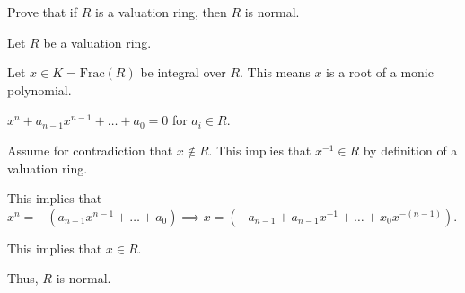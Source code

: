 \documentclass[12pt, letterpaper]{article}
\begin{document}
\color{\TextColor}
\pagecolor{\colormode}
\setlength{\parindent}{0pt}
\pagestyle{fancy}
\fancyhf{}

\begin{problem}{}
    Prove that if $R$ is a valuation ring, then $R$ is normal.
\end{problem}
\begin{problemproof}
    Let $R$ be a valuation ring.

    Let $x \in K=\mathrm{Frac}(R)$ be integral over $R$. This means $x$ is a root of a monic polynomial.

    $x^n+a_{n-1}x^{n-1}+\dots+a_0=0$ for $a_i \in R$.

    Assume for contradiction that $x \notin R$. This implies that $x^{-1} \in R$ by definition of a valuation ring.

    This implies that $x^n=-(a_{n-1}x^{n-1}+\dots+a_0) \implies x=(-a_{n-1}+a_{n-1}x^{-1}+\dots+x_0x^{-(n-1)})$.

    This implies that $x \in R$.

    Thus, $R$ is normal.
\end{problemproof}
\end{document}
